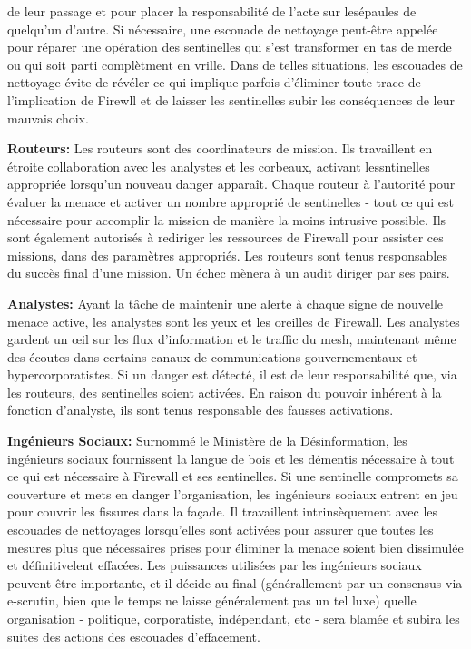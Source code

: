de leur passage et pour placer la responsabilité de l'acte sur lesépaules de quelqu'un d'autre. Si nécessaire, une escouade de nettoyage peut-être appelée pour réparer une opération des sentinelles qui s'est transformer en tas de merde ou qui soit parti complètment en vrille. Dans de telles situations, les escouades de nettoyage évite de révéler ce qui implique parfois d'éliminer toute trace de l'implication de Firewll et de laisser les sentinelles subir les conséquences de leur mauvais choix. 

\textbf{Routeurs:} Les routeurs sont des coordinateurs de mission. Ils travaillent en étroite collaboration avec les analystes et les corbeaux, activant lessntinelles appropriée lorsqu'un nouveau danger apparaît. Chaque routeur à l'autorité pour évaluer la menace et activer un nombre approprié de sentinelles - tout ce qui est nécessaire pour accomplir la mission de manière la moins intrusive possible. Ils sont également autorisés à rediriger les ressources de Firewall pour assister ces missions, dans des paramètres appropriés. Les routeurs sont tenus responsables du succès final d'une mission. Un échec mènera à un audit diriger par ses pairs. 

\textbf{Analystes:} Ayant la tâche de maintenir une alerte à chaque signe de nouvelle menace active, les analystes sont les yeux et les oreilles de Firewall. Les analystes gardent un œil sur les flux d'information et le traffic du mesh, maintenant même des écoutes dans certains canaux de communications gouvernementaux et hypercorporatistes. Si un danger est détecté, il est de leur responsabilité que, via les routeurs, des sentinelles soient activées. En raison du pouvoir inhérent à la fonction d'analyste, ils sont tenus responsable des fausses activations. 

\textbf{Ingénieurs Sociaux:} Surnommé le Ministère de la Désinformation, les ingénieurs sociaux fournissent la langue de bois et les démentis nécessaire à tout ce qui est nécessaire à Firewall et ses sentinelles. Si une sentinelle compromets sa couverture et mets en danger l'organisation, les ingénieurs sociaux entrent en jeu pour couvrir les fissures dans la façade. Il travaillent intrinsèquement avec les escouades de nettoyages lorsqu'elles sont activées pour assurer que toutes les mesures plus que nécessaires prises pour éliminer la menace soient bien dissimulée et définitivelent effacées. Les puissances utilisées par les ingénieurs sociaux peuvent être importante, et il décide au final (générallement par un consensus via e-scrutin, bien que le temps ne laisse généralement pas un tel luxe) quelle organisation - politique, corporatiste, indépendant, etc - sera blamée et subira les suites des actions des escouades d'effacement. 

